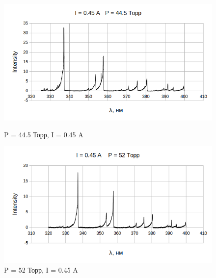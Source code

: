 \documentclass[a4paper,12pt]{article}
\begin{document}
	\begin{figure}[h]
	\begin{center}
	\begin{minipage}[h]{0.45\linewidth}
	\includegraphics[width=1\linewidth]{44_5_full}
	\caption{P = 44.5 Торр, I = 0.45 A} %
	\end{minipage}
	\hfill
	\begin{minipage}[h]{0.45\linewidth}
	\includegraphics[width=1\linewidth]{52_full}
	\caption{P = 52 Торр, I = 0.45 A}
	\end{minipage}
	\end{center}
	\end{figure}
	
\end{document}

